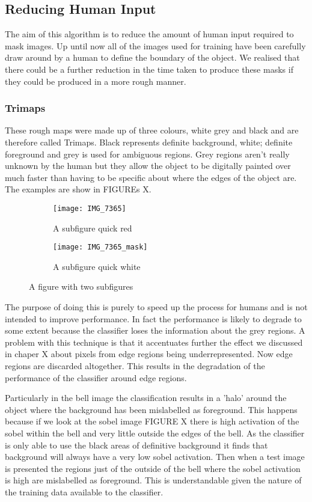 \documentclass[12pt]{IIBproject}
\begin{document}
\subsection{Reducing Human Input}
The aim of this algorithm is to reduce the amount of human input required to mask images. Up until now all of the images used for training have been carefully draw around by a human to define the boundary of the object. We realised that there could be a further reduction in the time taken to produce these masks if they could be produced in a more rough manner. 
\subsubsection{Trimaps}
These rough maps were made up of three colours, white grey and black and are therefore called Trimaps. Black represents definite background, white; definite foreground and grey is used for ambiguous regions. Grey regions aren't really unknown by the human but they allow the object to be digitally painted over much faster than having to be specific about where the edges of the object are. The examples are show in FIGUREs X. 

\begin{figure}[H]
\centering
\begin{subfigure}{.45\textwidth}
  \centering
  \texttt{[image: IMG\_7365]}
  \caption{A subfigure quick red}
  \label{fig:sub2}
\end{subfigure}
\begin{subfigure}{.45\textwidth}
  \centering
  \texttt{[image: IMG\_7365\_mask]}
  \caption{A subfigure quick white}
  \label{fig:sub1}
\end{subfigure}%


\caption{A figure with two subfigures}
\label{fig:test}
\end{figure}
The purpose of doing this is purely to speed up the process for humans and is not intended to improve performance. In fact the performance is likely to degrade to some extent because the classifier loses the information about the grey regions. 
A problem with this technique is that it accentuates further the effect we discussed in chaper X about pixels from edge regions being underrepresented. Now edge regions are discarded altogether. This results in the degradation of the performance of the classifier around edge regions. 

Particularly in the bell image the classification results in a 'halo' around the object where the background has been mislabelled as foreground. This happens because if we look at the sobel image FIGURE X there is high activation of the sobel within the bell and very little outside the edges of the bell. As the classifier is only able to use the black areas of definitive background it finds that background will always have a very low sobel activation. Then when a test image is presented the regions just of the outside of the bell where the sobel activation is high are mislabelled as foreground. This is understandable given the nature of the training data available to the classifier.
\end{document}
